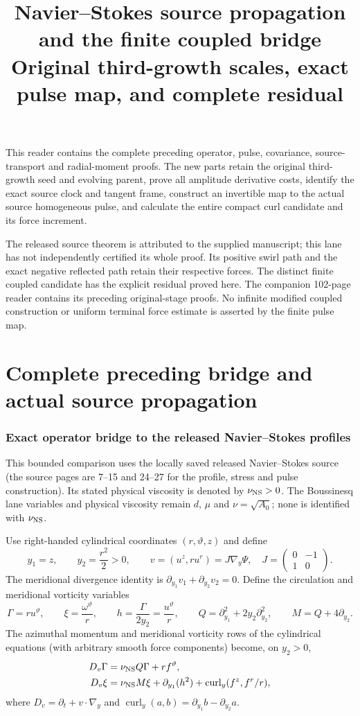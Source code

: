\documentclass[11pt]{article}
\title{Navier--Stokes source propagation and the finite coupled bridge\\
Original third-growth scales, exact pulse map, and complete residual}
\author{}\date{}
\begin{document}
\maketitle
This reader contains the complete preceding operator, pulse, covariance,
source-transport and radial-moment proofs. The new parts retain the
original third-growth seed and evolving parent, prove all amplitude
derivative costs, identify the exact source clock and tangent frame,
construct an invertible map to the actual source homogeneous pulse,
and calculate the entire compact curl candidate and its force increment.

The released source theorem is attributed to the supplied manuscript;
this lane has not independently certified its whole proof. Its positive
swirl path and the exact negative reflected path retain their respective
forces. The distinct finite coupled candidate has the explicit residual
proved here. The companion 102-page reader contains its preceding
original-stage proofs. No infinite modified coupled construction or
uniform terminal force estimate is asserted by the finite pulse map.
\tableofcontents\clearpage
\part{Complete preceding bridge and actual source propagation}
\section{Exact operator bridge to the released Navier--Stokes profiles}
\label{nsbridge:nsb:operator}

This bounded comparison uses the locally saved released Navier--Stokes source
(the source pages are 7--15 and 24--27 for the profile, stress and pulse
construction). Its stated physical viscosity is denoted by $\nu_{\rm NS}>0$.
The Boussinesq lane variables and physical viscosity remain $d$, $\mu$ and
$\nu=\sqrt{A_0}$; none is identified with $\nu_{\rm NS}$.

Use right-handed cylindrical coordinates $(r,\vartheta,z)$ and define
\[
 y_1=z,\qquad y_2=\frac{r^2}{2}>0,\qquad
 v=(u^z,ru^r)=J\nabla_y\Psi,
 \quad J=\begin{pmatrix}0&-1\\1&0\end{pmatrix}.
\]
The meridional divergence identity is
$\partial_{y_1}v_1+\partial_{y_2}v_2=0$. Define the circulation and
meridional vorticity variables
\[
 \Gamma=ru^\vartheta,
 \qquad \xi=\frac{\omega^\vartheta}{r},
 \qquad h=\frac{\Gamma}{2y_2}=\frac{u^\vartheta}{r},
 \qquad Q=\partial_{y_1}^2+2y_2\partial_{y_2}^2,
 \qquad M=Q+4\partial_{y_2}.
\]
The azimuthal momentum and meridional vorticity rows of the cylindrical
equations (with arbitrary smooth force components) become, on $y_2>0$,
\begin{align}
 D_v\Gamma&=\nu_{\rm NS}Q\Gamma+r f^\vartheta,
 \label{nsbridge:nsb:Gamma}\\
 D_v\xi&=\nu_{\rm NS}M\xi+\partial_{y_1}(h^2)
       +\operatorname{curl}_y(f^z,f^r/r),
 \label{nsbridge:nsb:xi}
\end{align}
where $D_v=\partial_t+v\cdot\nabla_y$ and
$\operatorname{curl}_y(a,b)=\partial_{y_1}b-\partial_{y_2}a$.
\end{document}
